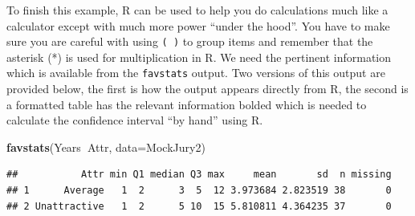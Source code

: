 \documentclass[]{book}
\newenvironment{Shaded}{\begin{snugshade}}{\end{snugshade}}
\newcommand{\KeywordTok}[1]{\textcolor[rgb]{0.13,0.29,0.53}{\textbf{#1}}}
\newcommand{\DataTypeTok}[1]{\textcolor[rgb]{0.13,0.29,0.53}{#1}}
\newcommand{\OperatorTok}[1]{\textcolor[rgb]{0.81,0.36,0.00}{\textbf{#1}}}
\newcommand{\NormalTok}[1]{#1}
\begin{document}
To finish this example, R can be used to help you do calculations much
like a calculator except with much more power ``under the hood''. You
have to make sure you are careful with using \texttt{(\ )} to group
items and remember that the asterisk (*) is used for multiplication in
R. We need the pertinent information which is available from the
\texttt{favstats} output. Two versions of this output are provided
below, the first is how the output appears directly from R, the second
is a formatted table has the relevant information bolded which is needed
to calculate the confidence interval ``by hand'' using R.

\begin{Shaded}
\begin{Highlighting}[]
\KeywordTok{favstats}\NormalTok{(Years}\OperatorTok{~}\NormalTok{Attr, }\DataTypeTok{data=}\NormalTok{MockJury2)}
\end{Highlighting}
\end{Shaded}

\begin{verbatim}
##           Attr min Q1 median Q3 max     mean       sd  n missing
## 1      Average   1  2      3  5  12 3.973684 2.823519 38       0
## 2 Unattractive   1  2      5 10  15 5.810811 4.364235 37       0
\end{verbatim}
\end{document}
